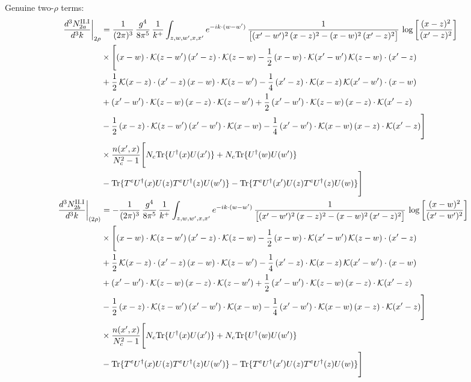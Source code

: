 \documentclass[9pt]{article}
\numberwithin{equation}{section}
\begin{document}
Genuine two-$\rho$ terms:
\begin{align}
\frac{d^{3}N^{\rm II.I}_{2a}}{d^{3}k}\bigg|_{2\rho}&=\frac{1}{(2\pi)^{3}}\,\frac{g^{4}}{8\pi^{5}}\,\frac{1}{k^{+}}\int_{z,w,w^{\prime},x,x^{\prime}}e^{-ik\cdot(w-w^{\prime})}\,\frac{1}{\big[(x^{\prime}-w^{\prime})^{2}\,(x-z)^{2}-(x-w)^{2}\,(x^{\prime}-z)^{2}\big]}\,\log\left[\frac{(x-z)^{2}}{(x^{\prime}-z)^{2}}\right]\notag\\
&\times\Bigg[(x-w)\cdot\mathcal{K}(z-w^{\prime})\,(x^{\prime}-z)\cdot\mathcal{K}(z-w)-\frac{1}{2}\,(x-w)\cdot\mathcal{K}(x^{\prime}-w^{\prime})\,\mathcal{K}(z-w)\cdot(x^{\prime}-z)\notag \\ & +\frac{1}{2}\,\mathcal{K}(x-z)\cdot(x^{\prime}-z)\,(x-w)\cdot\mathcal{K}(z-w^{\prime}) -\frac{1}{4}\,(x^{\prime}-z)\cdot\mathcal{K}(x-z)\,\mathcal{K}(x^{\prime}-w^{\prime})\cdot(x-w)\notag \\ & +(x^{\prime}-w^{\prime})\cdot\mathcal{K}(z-w)\,(x-z)\cdot\mathcal{K}(z-w^{\prime})+\frac{1}{2}\,(x^{\prime}-w^{\prime})\cdot\mathcal{K}(z-w)\,(x-z)\cdot\mathcal{K}(x^{\prime}-z)\notag \\ & -\frac{1}{2}\,(x-z)\cdot\mathcal{K}(z-w^{\prime})\,(x^{\prime}-w^{\prime})\cdot\mathcal{K}(x-w)-\frac{1}{4}\,(x^{\prime}-w^{\prime})\cdot\mathcal{K}(x-w)\,(x-z)\cdot\mathcal{K}(x^{\prime}-z)\Bigg]\notag\\ &\times\frac{n(x',x)}{N_{c}^{2}-1}\Bigg[N_{c}{\rm Tr}\{U^{\dagger}(x)U(x')\}+N_{c}{\rm Tr}\{U^{\dagger}(w)U(w')\}\notag\\ &-{\rm Tr}\{T^{e}U^{\dagger}(x)U(z)T^{e}U^{\dagger}(z)U(w')\}-{\rm Tr}\{T^{e}U^{\dagger}(x')U(z)T^{e}U^{\dagger}(z)U(w)\}\Bigg]\\
\frac{d^{3}N^{\rm II.I}_{2b}}{d^{3}k}\bigg|_{(2\rho)}&= -\frac{1}{(2\pi)^{3}}\,\frac{g^{4}}{8\pi^{5}}\,\frac{1}{k^{+}}\int_{z,w,w^{\prime},x,x^{\prime}}e^{-ik\cdot(w-w^{\prime})}\,\frac{1}{\big[(x^{\prime}-w^{\prime})^{2}\,(x-z)^{2}-(x-w)^{2}\,(x^{\prime}-z)^{2}\big]}\,\log\left[\frac{(x-w)^{2}}{(x^{\prime}-w^{\prime})^{2}}\right]\notag\\
&\times\Bigg[(x-w)\cdot\mathcal{K}(z-w^{\prime})\,(x^{\prime}-z)\cdot\mathcal{K}(z-w)-\frac{1}{2}\,(x-w)\cdot\mathcal{K}(x^{\prime}-w^{\prime})\,\mathcal{K}(z-w)\cdot(x^{\prime}-z)\notag \\ & +\frac{1}{2}\,\mathcal{K}(x-z)\cdot(x^{\prime}-z)\,(x-w)\cdot\mathcal{K}(z-w^{\prime}) -\frac{1}{4}\,(x^{\prime}-z)\cdot\mathcal{K}(x-z)\,\mathcal{K}(x^{\prime}-w^{\prime})\cdot(x-w)\notag \\ & +(x^{\prime}-w^{\prime})\cdot\mathcal{K}(z-w)\,(x-z)\cdot\mathcal{K}(z-w^{\prime})+\frac{1}{2}\,(x^{\prime}-w^{\prime})\cdot\mathcal{K}(z-w)\,(x-z)\cdot\mathcal{K}(x^{\prime}-z)\notag \\ & -\frac{1}{2}\,(x-z)\cdot\mathcal{K}(z-w^{\prime})\,(x^{\prime}-w^{\prime})\cdot\mathcal{K}(x-w)-\frac{1}{4}\,(x^{\prime}-w^{\prime})\cdot\mathcal{K}(x-w)\,(x-z)\cdot\mathcal{K}(x^{\prime}-z)\Bigg]\notag\\ &\times\frac{n(x',x)}{N_{c}^{2}-1}\Bigg[N_{c}{\rm Tr}\{U^{\dagger}(x)U(x')\}+N_{c}{\rm Tr}\{U^{\dagger}(w)U(w')\}\notag\\ &-{\rm Tr}\{T^{e}U^{\dagger}(x)U(z)T^{e}U^{\dagger}(z)U(w')\}-{\rm Tr}\{T^{e}U^{\dagger}(x')U(z)T^{e}U^{\dagger}(z)U(w)\}\Bigg]\\

\end{align}
\end{document}
